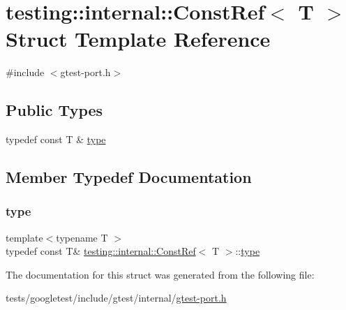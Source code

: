 \hypertarget{structtesting_1_1internal_1_1ConstRef}{}\section{testing\+:\+:internal\+:\+:Const\+Ref$<$ T $>$ Struct Template Reference}
\label{structtesting_1_1internal_1_1ConstRef}


{\ttfamily \#include $<$gtest-\/port.\+h$>$}

\subsection*{Public Types}
\begin{DoxyCompactItemize}
\item 
typedef const T \& \hyperlink{structtesting_1_1internal_1_1ConstRef_a53610a4d0e72958332222b0a85f8937a}{type}
\end{DoxyCompactItemize}


\subsection{Member Typedef Documentation}
\mbox{\label{structtesting_1_1internal_1_1ConstRef_a53610a4d0e72958332222b0a85f8937a}} 
\subsubsection{\texorpdfstring{type}{type}}
{\footnotesize\ttfamily template$<$typename T $>$ \\
typedef const T\& \hyperlink{structtesting_1_1internal_1_1ConstRef}{testing\+::internal\+::\+Const\+Ref}$<$ T $>$\+::\hyperlink{structtesting_1_1internal_1_1ConstRef_a53610a4d0e72958332222b0a85f8937a}{type}}



The documentation for this struct was generated from the following file\+:\begin{DoxyCompactItemize}
\item 
tests/googletest/include/gtest/internal/\hyperlink{gtest-port_8h}{gtest-\/port.\+h}\end{DoxyCompactItemize}
